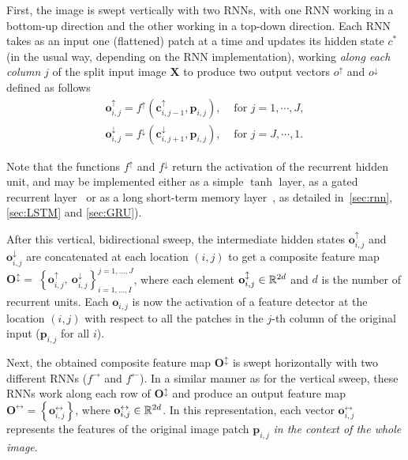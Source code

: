 First, the image is swept vertically with two RNNs, with one RNN working in a
bottom-up direction and the other working in a top-down direction.  Each RNN
takes as an input one (flattened) patch at a time and updates its hidden state
$c^*$ (in the usual way, depending on the RNN implementation), working
\emph{along each column} $j$ of the split input image $\mathbf{X}$ to produce
two output vectors $o^{\uparrow}$ and $o^{\downarrow}$ defined as follows
\begin{align}
    \mathbf{o}^{\uparrow}_{i,j} = f^\uparrow(\mathbf{c}^{\uparrow}_{
        i,j-1},\mathbf{p}_{i,j}), &\text{ for }j=1,\cdots, J,\\
    \mathbf{o}^{\downarrow}_{i,j} = f^\downarrow(\mathbf{c}^{\downarrow}_{
        i,j+1},\mathbf{p}_{i,j}), &\text{ for }j=J,\cdots,1.
\end{align}

Note that the functions $f^\uparrow$ and $f^\downarrow$ return the
activation of the recurrent hidden unit, and may be implemented either as a
simple $\tanh$ layer, as a gated recurrent layer~\citep{Cho2014} or as a long
short-term memory layer~\citep{Hochreiter+Schmidhuber-1997}, as detailed
in~\autoref{sec:rnn}, \autoref{sec:LSTM} and \autoref{sec:GRU}).

After this vertical, bidirectional sweep, the intermediate hidden states
$\mathbf{o}^{\uparrow}_{i,j}$ and $\mathbf{o}^{\downarrow}_{i,j}$ are
concatenated at each location $(i,j)$ to get a composite feature map
$\mathbf{O}^\updownarrow=~\left\{\mathbf{o}_{i,j}^{\uparrow},~\mathbf{o}_{i,j}^
{\downarrow}\right\}_{i=1,\ldots,I}^{j=1,\ldots,J}$, where each element
$\mathbf{o}^\updownarrow_{i,j} \in \mathbb{R}^{2d}$ and $d$ is the number of recurrent
units. Each $\mathbf{o}_{i,j}$ is now the activation of a feature detector at
the location $(i,j)$ with respect to all the patches in the $j$-th column of
the original input ($\mathbf{p}_{i, j}$ for all $i$).

Next, the obtained composite feature map $\mathbf{O}^\updownarrow$ is swept
horizontally with two different RNNs ($f^{\rightarrow}$ and $f^{\leftarrow}$).
In a similar manner as for the vertical sweep, these RNNs work along each row
of $\mathbf{O}^\updownarrow$ and produce an output feature map
$\mathbf{O}^\leftrightarrow = \left\{\mathbf{o}^\leftrightarrow_{i,j}
\right\}$, where $\mathbf{o}^\leftrightarrow_{i,j} \in \mathbb{R}^{2d}$. In this
representation, each vector $\mathbf{o}^\leftrightarrow_{i,j}$ represents the
features of the original image patch $\mathbf{p}_{i,j}$ \emph{in the context of
the whole image}.

